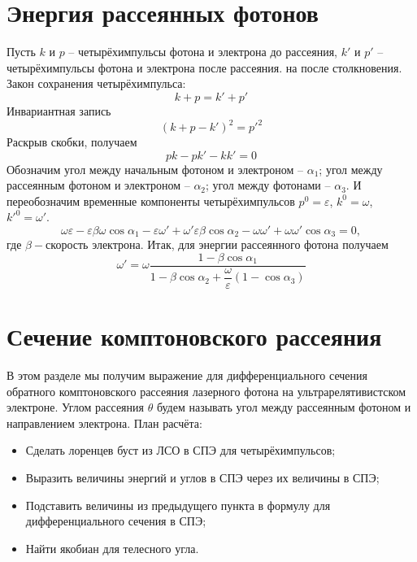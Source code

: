 \documentclass[14pt, a4paper]{extreport}
\begin{document}
\section{Энергия рассеянных фотонов}
Пусть $k$ и $p$ -- четырёхимпульсы фотона и электрона до рассеяния, $k'$ и $p'$ -- четырёхимпульсы фотона и электрона после рассеяния.
на после столкновения.
Закон сохранения четырёхимпульса:
\begin{equation}
    k + p = k' + p'
\end{equation}
Инвариантная запись 
\begin{equation}
    (k + p - k')^2  = p'^2
\end{equation}
Раскрыв скобки, получаем
\begin{equation}
   pk -pk' - kk'  = 0
\end{equation}
Обозначим угол между начальным фотоном и электроном -- $\alpha_1$; угол между рассеянным фотоном и электроном -- $\alpha_2$; угол между фотонами -- $\alpha_3$.
И переобозначим временные компоненты четырёхимпульсов $p^0 = \varepsilon$, $k^0 = \omega$, $k'^0 = \omega'$. 
\begin{equation}
    \omega \varepsilon - \varepsilon \beta \omega \cos \alpha_1 - \varepsilon\omega' + \omega' \varepsilon \beta \cos \alpha_2 - \omega \omega' + \omega\omega' \cos \alpha_3 = 0,
\end{equation}
где $\beta-$скорость электрона.
Итак, для энергии рассеянного фотона получаем
\begin{equation}
    \label{eq:compt_en}
    \omega' = \omega \dfrac{1 - \beta\cos\alpha_1 }{1 - \beta \cos\alpha_2 + \dfrac{\omega}{\varepsilon}\left(1-\cos\alpha_3 \right)}
\end{equation}
\section{Сечение комптоновского рассеяния}
В этом разделе мы получим выражение для дифференциального сечения обратного комптоновского рассеяния 
лазерного фотона на ультрарелятивистском электроне. 
Углом рассеяния $\theta$ будем называть угол между рассеянным фотоном и направлением электрона.
План расчёта:
\begin{itemize}
    \item Сделать лоренцев буст из ЛСО в СПЭ для четырёхимпульсов;
    \item Выразить величины энергий и углов в СПЭ через их величины в СПЭ;
    \item Подставить величины из предыдущего пункта в формулу для дифференциального сечения в СПЭ;
    \item Найти якобиан для телесного угла.
\end{itemize}
\end{document}
